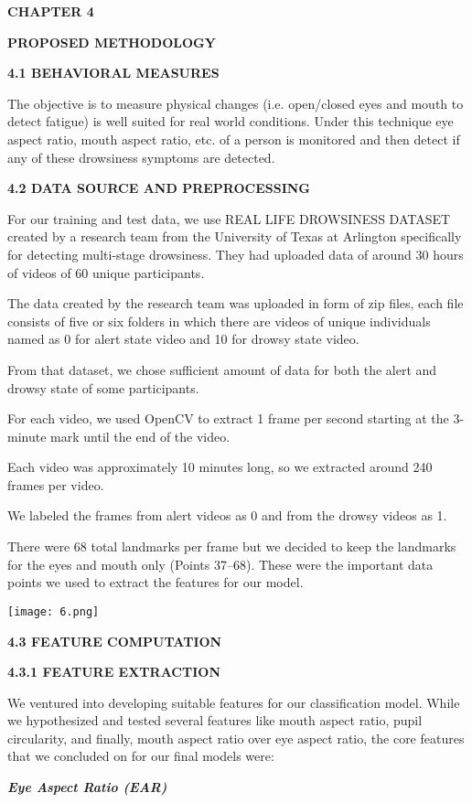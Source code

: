 \documentclass[a4paper,12pt]{article}
\begin{document}
\textbf{CHAPTER 4}

\textbf{PROPOSED METHODOLOGY}

\textbf{4.1 BEHAVIORAL MEASURES}

The objective is to measure physical changes (i.e. open/closed eyes and
mouth to detect fatigue) is well suited for real world conditions. Under
this technique eye aspect ratio, mouth aspect ratio, etc. of a person is
monitored and then detect if any of these drowsiness symptoms are
detected.

\textbf{4.2 DATA SOURCE AND PREPROCESSING}

For our training and test data, we use REAL LIFE DROWSINESS DATASET
created by a research team from the University of Texas at Arlington
specifically for detecting multi-stage drowsiness. They had uploaded
data of around 30 hours of videos of 60 unique participants.

The data created by the research team was uploaded in form of zip files,
each file consists of five or six folders in which there are videos of
unique individuals named as 0 for alert state video and 10 for drowsy
state video.

From that dataset, we chose sufficient amount of data for both the alert
and drowsy state of some participants.

For each video, we used OpenCV to extract 1 frame per second starting at
the 3-minute mark until the end of the video.

Each video was approximately 10 minutes long, so we extracted around 240
frames per video.

We labeled the frames from alert videos as 0 and from the drowsy videos
as 1.

There were 68 total landmarks per frame but we decided to keep the
landmarks for the eyes and mouth only (Points 37--68). These were the
important data points we used to extract the features for our model.

\texttt{[image: 6.png]}

\textbf{4.3 FEATURE COMPUTATION}

\textbf{4.3.1 FEATURE EXTRACTION}

We ventured into developing suitable features for our classification
model. While we hypothesized and tested several features like mouth
aspect ratio, pupil circularity, and finally, mouth aspect ratio over
eye aspect ratio, the core features that we concluded on for our final
models were:

\emph{\textbf{Eye Aspect Ratio (EAR)}}
\end{document}

